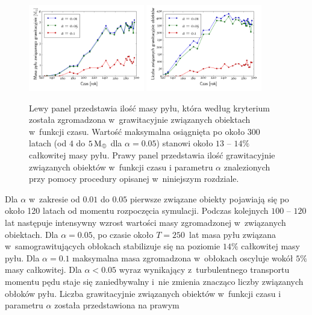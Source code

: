 \begin{figure}[ht]
  \centering
  \includegraphics[width=0.45\textwidth]{figures/bmass_vs_time}
  \includegraphics[width=0.45\textwidth]{figures/nclumps_vs_time}
  \caption[Ilość masy pyłu, która według kryterium~
     została zgromadzona w~grawitacyjnie związanych obiektach w~funkcji czasu.]
    {Lewy panel przedstawia ilość masy pyłu, która według
     kryterium~ została zgromadzona w~grawitacyjnie związanych
     obiektach w~funkcji czasu. Wartość maksymalna osiągnięta po około 300
     latach (od $4$ do $5\hbox{$\mathrm{\thinspace M_{\oplus}}$}$ dla $\alpha = 0.05$) stanowi około $13$ -- $14\%$
     całkowitej masy pyłu. Prawy panel przedstawia ilość grawitacyjnie
     związanych obiektów w~funkcji czasu i parametru $\alpha$ znalezionych przy
     pomocy procedury opisanej w~niniejszym rozdziale.}
  \label{fig:bmasstime} 
\end{figure}
%
Dla $\alpha$ w~zakresie od $0.01$ do $0.05$ pierwsze związane obiekty pojawiają
się po około 120 latach od momentu rozpoczęcia symulacji. Podczas kolejnych
$100$ -- $120$ lat następuje intensywny wzrost wartości masy zgromadzonej
w~związanych obiektach. Dla $\alpha = 0.05$, po czasie około $T = 250$~lat masa
pyłu związana w~samograwitujących obłokach stabilizuje się na poziomie $14\%$
całkowitej masy pyłu. Dla $\alpha = 0.1$ maksymalna masa zgromadzona w~obłokach
oscyluje wokół $5\%$ masy całkowitej. Dla $\alpha < 0.05$ wyraz wynikający
z~turbulentnego transportu momentu pędu staje się zaniedbywalny i~nie zmienia
znacząco liczby związanych obłoków pyłu. Liczba grawitacyjnie związanych
obiektów w~funkcji czasu i parametru $\alpha$ została przedstawiona na prawym
